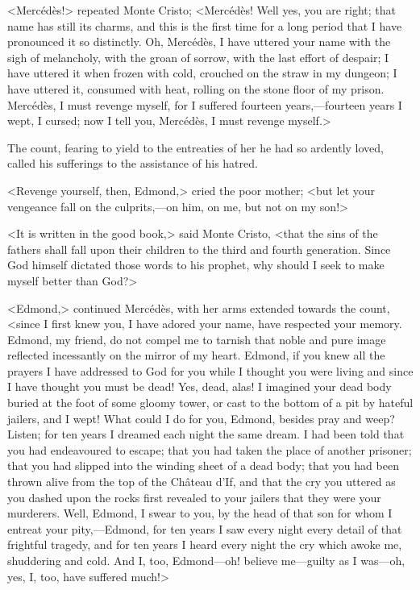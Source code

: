  <Mercédès!> repeated Monte Cristo; <Mercédès! Well yes, you are right; that name has still its charms, and this is the first time for a long period that I have pronounced it so distinctly. Oh, Mercédès, I have uttered your name with the sigh of melancholy, with the groan of sorrow, with the last effort of despair; I have uttered it when frozen with cold, crouched on the straw in my dungeon; I have uttered it, consumed with heat, rolling on the stone floor of my prison. Mercédès, I must revenge myself, for I suffered fourteen years,—fourteen years I wept, I cursed; now I tell you, Mercédès, I must revenge myself.> 

 The count, fearing to yield to the entreaties of her he had so ardently loved, called his sufferings to the assistance of his hatred. 

 <Revenge yourself, then, Edmond,> cried the poor mother; <but let your vengeance fall on the culprits,—on him, on me, but not on my son!> 

 <It is written in the good book,> said Monte Cristo, <that the sins of the fathers shall fall upon their children to the third and fourth generation. Since God himself dictated those words to his prophet, why should I seek to make myself better than God?> 

 <Edmond,> continued Mercédès, with her arms extended towards the count, <since I first knew you, I have adored your name, have respected your memory. Edmond, my friend, do not compel me to tarnish that noble and pure image reflected incessantly on the mirror of my heart. Edmond, if you knew all the prayers I have addressed to God for you while I thought you were living and since I have thought you must be dead! Yes, dead, alas! I imagined your dead body buried at the foot of some gloomy tower, or cast to the bottom of a pit by hateful jailers, and I wept! What could I do for you, Edmond, besides pray and weep? Listen; for ten years I dreamed each night the same dream. I had been told that you had endeavoured to escape; that you had taken the place of another prisoner; that you had slipped into the winding sheet of a dead body; that you had been thrown alive from the top of the Château d'If, and that the cry you uttered as you dashed upon the rocks first revealed to your jailers that they were your murderers. Well, Edmond, I swear to you, by the head of that son for whom I entreat your pity,—Edmond, for ten years I saw every night every detail of that frightful tragedy, and for ten years I heard every night the cry which awoke me, shuddering and cold. And I, too, Edmond—oh! believe me—guilty as I was—oh, yes, I, too, have suffered much!> 

